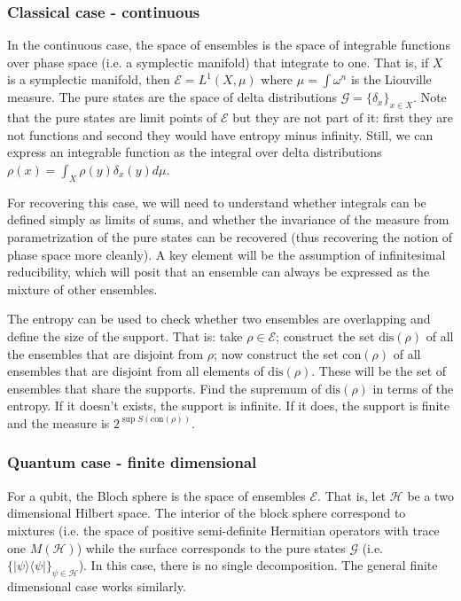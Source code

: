 \documentclass[11pt]{article}
\def\>{\rangle}
\def\<{\langle}
\begin{document}
\subsubsection{Classical case - continuous}

In the continuous case, the space of ensembles is the space of integrable functions over phase space (i.e. a symplectic manifold) that integrate to one. That is, if $X$ is a symplectic manifold, then $\mathcal{E} = L^1(X, \mu)$ where $\mu=\int \omega^n$ is the Liouville measure. The pure states are the space of delta distributions $\mathcal{G} = \{\delta_x\}_{x \in X}$. Note that the pure states are limit points of $\mathcal{E}$ but they are not part of it: first they are not functions and second they would have entropy minus infinity. Still, we can express an integrable function as the integral over delta distributions $\rho(x) = \int_X \rho(y) \delta_x(y) d\mu$.

For recovering this case, we will need to understand whether integrals can be defined simply as limits of sums, and whether the invariance of the measure from parametrization of the pure states can be recovered (thus recovering the notion of phase space more cleanly). A key element will be the assumption of infinitesimal reducibility, which will posit that an ensemble can always be expressed as the mixture of other ensembles.

The entropy can be used to check whether two ensembles are overlapping and define the size of the support. That is: take $\rho \in \mathcal{E}$; construct the set $\text{dis}(\rho)$ of all the ensembles that are disjoint from $\rho$; now construct the set $\text{con}(\rho)$ of all ensembles that are disjoint from all elements of $\text{dis}(\rho)$. These will be the set of ensembles that share the supports. Find the supremum of $\text{dis}(\rho)$ in terms of the entropy. If it doesn't exists, the support is infinite. If it does, the support is finite and the measure is $2^{\sup S(\text{con}(\rho))}$.

\subsubsection{Quantum case - finite dimensional}

For a qubit, the Bloch sphere is the space of ensembles $\mathcal{E}$. That is, let $\mathcal{H}$ be a two dimensional Hilbert space. The interior of the block sphere correspond to mixtures (i.e. the space of positive semi-definite Hermitian operators with trace one $M(\mathcal{H})$) while the surface corresponds to the pure states $\mathcal{G}$ (i.e. $\{ |\psi\> \<\psi| \}_{\psi \in \mathcal{H}}$). In this case, there is no single decomposition. The general finite dimensional case works similarly.
\end{document}
